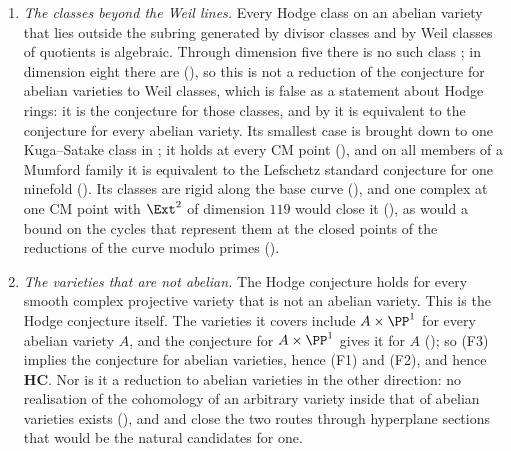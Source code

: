 \begin{corollary}
\begin{enumerate}[label=\textup{(F\arabic*)},leftmargin=3.0em,itemsep=4pt]
  to reach, $7n^{2}-2n$ for a general shape. For one family its
  conclusion is equivalent to the Lefschetz standard conjecture for one
  variety (). The bounded criterion \textup{(P1)} is not a
  second form of the same demand: by
  \cite[Theorem~16.17]{paperI} it is equivalent to the conclusion it was to imply,
  and \cite[Theorem~16.15]{paperI} shows that the one cycle it could have been tested
  on, the transport of the base cycle, does not satisfy it.
\item \emph{The classes beyond the Weil lines.} Every Hodge class on an
  abelian variety that lies outside the subring generated by divisor classes
  and by Weil classes of quotients is algebraic. Through dimension five there
  is no such class \cite{MZ99}; in dimension eight there are
  (), so this is not a reduction of the conjecture
  for abelian varieties to Weil classes, which is false as a statement about
  Hodge rings: it is the conjecture for those classes, and by
   it is equivalent to the conjecture for every abelian
  variety. Its smallest case is
  brought down to one Kuga--Satake class in ; it holds at
  every CM point (), and on all members of a Mumford
  family it is equivalent to the Lefschetz standard conjecture for one
  ninefold (). Its classes are rigid along the base
  curve (), and one complex at one CM point with
  $\Ext^{2}$ of dimension $119$ would close it (),
  as would a bound on the cycles that represent them at the closed points of
  the reductions of the curve modulo primes ().
\item \emph{The varieties that are not abelian.} The Hodge conjecture holds
  for every smooth complex projective variety that is not an abelian variety.
  This is the Hodge conjecture itself. The varieties it covers include
  $A\times\PP^{1}$ for every abelian variety $A$, and the conjecture for
  $A\times\PP^{1}$ gives it for $A$ (); so (F3) implies
  the conjecture for abelian varieties, hence (F1) and (F2), and hence
  $\mathbf{HC}$. Nor is it a reduction to abelian varieties in the other
  direction: no realisation of the cohomology of an arbitrary variety inside
  that of abelian varieties exists (), and
  \cite[Theorem~10.3]{paperI} and \cite[Theorem~10.8]{paperI} close the two routes
  through hyperplane sections that would be the natural candidates for one.
\end{enumerate}
\end{corollary}

